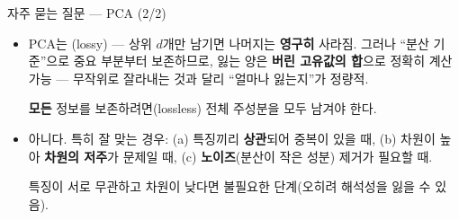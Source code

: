 \begin{frame}{자주 묻는 질문 --- PCA (2/2)}
  \small
  \begin{itemize}
    \item {}
      PCA는 (lossy) --- 상위 $d$개만 남기면 나머지는
      \textbf{영구히} 사라짐. 그러나 ``분산 기준''으로 중요 부분부터
      보존하므로, 잃는 양은 \textbf{버린 고유값의 합}으로 정확히 계산
      가능 --- 무작위로 잘라내는 것과 달리 ``얼마나 잃는지''가 정량적.
      \par \textbf{모든} 정보를 보존하려면(lossless) 전체 주성분을
      모두 남겨야 한다.
    \item {}
      아니다. 특히 잘 맞는 경우: (a) 특징끼리 \textbf{상관}되어 중복이
      있을 때, (b) 차원이 높아 \textbf{차원의 저주}가 문제일 때,
      (c) \textbf{노이즈}(분산이 작은 성분) 제거가 필요할 때.
      \par 특징이 서로 무관하고 차원이 낮다면 불필요한 단계(오히려
      해석성을 잃을 수 있음).
  \end{itemize}
\end{frame}
